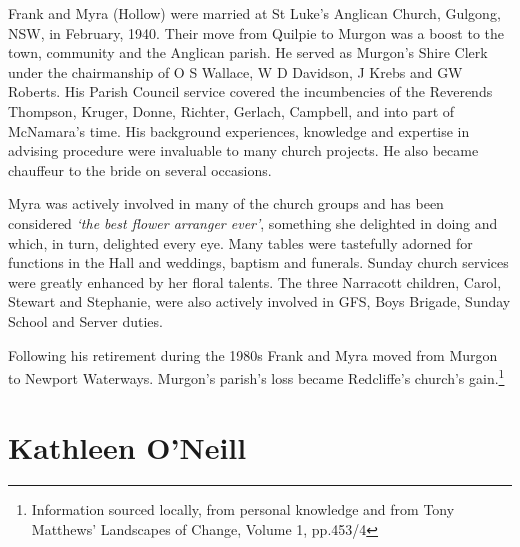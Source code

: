 Frank and Myra (Hollow) were married at St Luke's Anglican Church, Gulgong, NSW, in February, 1940. Their move from Quilpie to Murgon was a boost to the town, community and the Anglican parish. He served as Murgon's Shire Clerk under the chairmanship of O S Wallace, W D Davidson, J Krebs and GW Roberts. His Parish Council service covered the incumbencies of the Reverends Thompson, Kruger, Donne, Richter, Gerlach, Campbell, and into part of McNamara's time. His background experiences, knowledge and expertise in advising procedure were invaluable to many church projects. He also became chauffeur to the bride on several occasions.



Myra was actively involved in many of the church groups and has been considered \emph{`the best flower arranger ever'}, something she delighted in doing and which, in turn, delighted every eye. Many tables were tastefully adorned for functions in the Hall and weddings, baptism and funerals. Sunday church services were greatly enhanced by her floral talents. The three Narracott children, Carol, Stewart and Stephanie, were also actively involved in GFS, Boys Brigade, Sunday School and Server duties.



Following his retirement during the 1980s Frank and Myra moved from Murgon to Newport Waterways. Murgon's parish's loss became Redcliffe's church's gain.\footnote{Information sourced locally, from personal knowledge and from Tony Matthews' Landscapes of Change, Volume 1, pp.453/4}


\section{Kathleen O'Neill}



